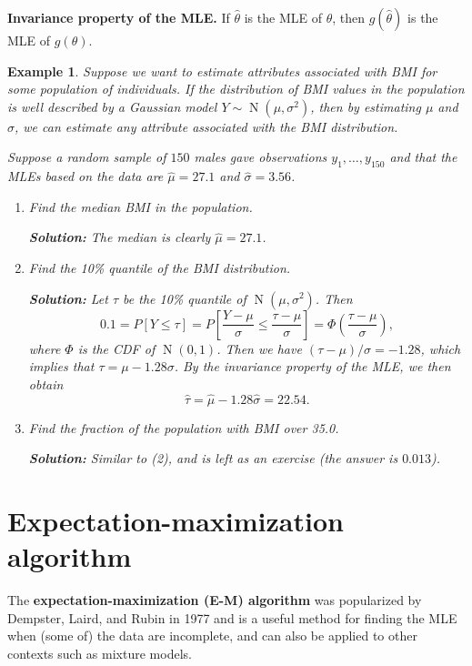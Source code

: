 \documentclass[10pt]{article}
\DeclareMathOperator{\Nor}{N}
\theoremstyle{newstyle}
\newtheorem{exmp}[thm]{Example}
\begin{document}
{\bf Invariance property of the MLE.} If $\hat\theta$ is the MLE of $\theta$, 
then $g(\hat\theta)$ is the MLE of $g(\theta)$. 

\begin{exmp}
Suppose we want to estimate attributes associated with BMI for some population of individuals. If the distribution of BMI values in the population is well described by a Gaussian model $Y \sim 
\Nor(\mu, \sigma^2)$, then by estimating $\mu$ and $\sigma$, we can estimate any attribute associated with the BMI distribution.

Suppose a random sample of $150$ males gave observations $y_1, \dots, y_{150}$ and 
that the MLEs based on the data are $\hat\mu = 27.1$ and $\hat\sigma = 3.56$. 

\begin{enumerate}[(1)]

    \item Find the median BMI in the population. 
    
    {\color{blue} {\bf Solution:} The median is clearly $\hat\mu = 27.1$.}
    
    \item Find the 10\% quantile of the BMI distribution. 
    
    {\color{blue} {\bf Solution:} Let $\tau$ be the 10\% quantile of $\Nor(\mu, \sigma^2)$. Then 
    \[ 0.1 = P[Y \leq \tau] = P\left[ \frac{Y-\mu}\sigma \leq \frac{\tau-\mu}\sigma \right] 
    = \Phi\left(\frac{\tau-\mu}\sigma\right), \]
    where $\Phi$ is the CDF of $\Nor(0, 1)$. Then we have $(\tau - \mu)/\sigma = -1.28$, 
    which implies that $\tau = \mu - 1.28\sigma$. By the invariance property of the MLE, we 
    then obtain 
    \[ \hat\tau = \hat\mu - 1.28\hat\sigma = 22.54. \]}
    
    \item Find the fraction of the population with BMI over 35.0. 
    
    {\color{blue} {\bf Solution:} Similar to (2), and is left as an exercise (the answer is $0.013$).}
    
\end{enumerate}
\end{exmp}

\newpage 
\section{Expectation-maximization algorithm}

The {\bf expectation-maximization (E-M) algorithm} was popularized by Dempster, Laird, 
and Rubin in 1977 and is a useful method for finding the MLE when (some of) the data 
are incomplete, and can also be applied to other contexts such as mixture models. 
\end{document}
